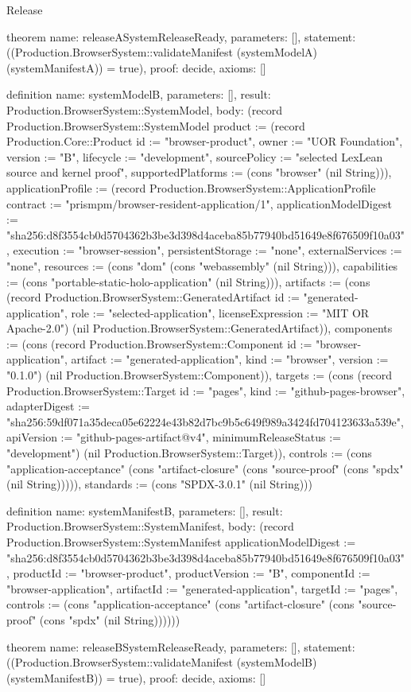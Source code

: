 \begin{lexlean}{Release}
\begin{semanticmodule}
theorem{
  name: releaseASystemReleaseReady,
  parameters: [],
  statement: ((Production.BrowserSystem::validateManifest (systemModelA) (systemManifestA)) = true),
  proof: decide{},
  axioms: []
}

definition{
  name: systemModelB,
  parameters: [],
  result: Production.BrowserSystem::SystemModel,
  body: (record Production.BrowserSystem::SystemModel {product := (record Production.Core::Product {id := "browser-product", owner := "UOR Foundation", version := "B", lifecycle := "development", sourcePolicy := "selected LexLean source and kernel proof", supportedPlatforms := (cons "browser" (nil String))}), applicationProfile := (record Production.BrowserSystem::ApplicationProfile {contract := "prismpm/browser-resident-application/1", applicationModelDigest := "sha256:d8f3554cb0d5704362b3be3d398d4aceba85b77940bd51649e8f676509f10a03", execution := "browser-session", persistentStorage := "none", externalServices := "none", resources := (cons "dom" (cons "webassembly" (nil String))), capabilities := (cons "portable-static-holo-application" (nil String))}), artifacts := (cons (record Production.BrowserSystem::GeneratedArtifact {id := "generated-application", role := "selected-application", licenseExpression := "MIT OR Apache-2.0"}) (nil Production.BrowserSystem::GeneratedArtifact)), components := (cons (record Production.BrowserSystem::Component {id := "browser-application", artifact := "generated-application", kind := "browser", version := "0.1.0"}) (nil Production.BrowserSystem::Component)), targets := (cons (record Production.BrowserSystem::Target {id := "pages", kind := "github-pages-browser", adapterDigest := "sha256:59df071a35deca05e62224e43b82d7bc9b5c649f989a3424fd704123633a539e", apiVersion := "github-pages-artifact@v4", minimumReleaseStatus := "development"}) (nil Production.BrowserSystem::Target)), controls := (cons "application-acceptance" (cons "artifact-closure" (cons "source-proof" (cons "spdx" (nil String))))), standards := (cons "SPDX-3.0.1" (nil String))})
}

definition{
  name: systemManifestB,
  parameters: [],
  result: Production.BrowserSystem::SystemManifest,
  body: (record Production.BrowserSystem::SystemManifest {applicationModelDigest := "sha256:d8f3554cb0d5704362b3be3d398d4aceba85b77940bd51649e8f676509f10a03", productId := "browser-product", productVersion := "B", componentId := "browser-application", artifactId := "generated-application", targetId := "pages", controls := (cons "application-acceptance" (cons "artifact-closure" (cons "source-proof" (cons "spdx" (nil String)))))})
}

theorem{
  name: releaseBSystemReleaseReady,
  parameters: [],
  statement: ((Production.BrowserSystem::validateManifest (systemModelB) (systemManifestB)) = true),
  proof: decide{},
  axioms: []
}
\end{semanticmodule}
\end{lexlean}
